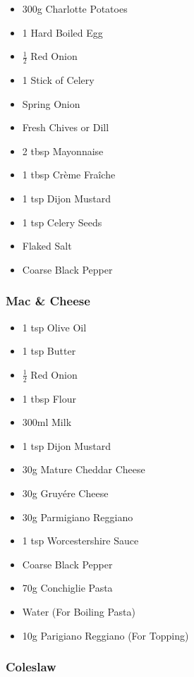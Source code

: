 \documentclass[11pt, english]{article}
\begin{document}
	\begin{itemize}
        \setlength\itemsep{0cm}
                \item 300g Charlotte Potatoes
		\item 1 Hard Boiled Egg
		\item $\frac{1}{2}$ Red Onion
		\item 1 Stick of Celery
		\item Spring Onion
		\item Fresh Chives or Dill
		\item 2 tbsp Mayonnaise
		\item 1 tbsp Cr\`{e}me Fra\^{i}che
                \item 1 tsp Dijon Mustard
                \item 1 tsp Celery Seeds
                \item Flaked Salt
                \item Coarse Black Pepper
        \end{itemize}

		\subsubsection*{Mac \& Cheese}

	\begin{itemize}
        \setlength\itemsep{0cm}
                \item 1 tsp Olive Oil
		\item 1 tsp Butter
		\item $\frac{1}{2}$ Red Onion
		\item 1 tbsp Flour
		\item 300ml Milk
		\item 1 tsp Dijon Mustard
		\item 30g Mature Cheddar Cheese
		\item 30g Gruy\'{e}re Cheese
		\item 30g Parmigiano Reggiano
		\item 1 tsp Worcestershire Sauce
		\item Coarse Black Pepper
		\item 70g Conchiglie Pasta
		\item Water (For Boiling Pasta)
		\item 10g Parigiano Reggiano (For Topping)
        \end{itemize}

		\subsubsection*{Coleslaw}
\end{document}
